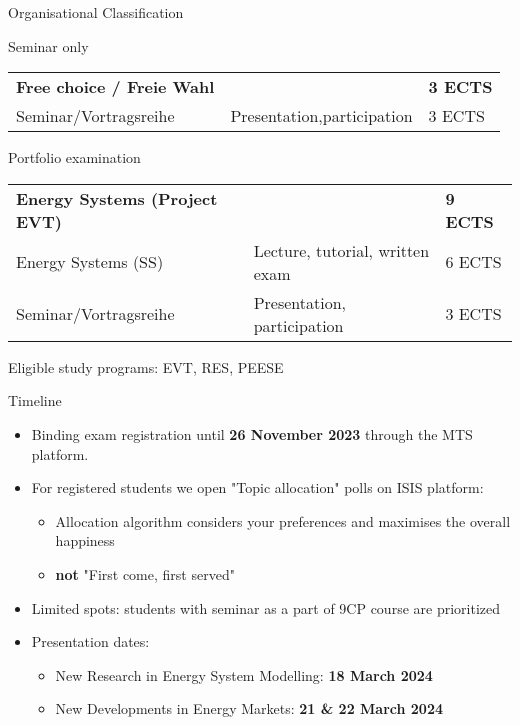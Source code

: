 \documentclass[10pt,aspectratio=169,dvipsnames]{beamer}
\begin{document}
\begin{frame}{Organisational Classification}

    \begin{block}{Seminar only}
          \begin{tabularx}{0.8\textwidth}{l l l}
            \textbf{Free choice / Freie Wahl} & & \textbf{3 ECTS}\\
            Seminar/Vortragsreihe & Presentation,participation & 3 ECTS
          \end{tabularx}
    \end{block}
    \begin{block}{Portfolio examination}
    \begin{tabularx}{0.8\textwidth}{l l l}
            \textbf{Energy Systems (Project EVT)} & & \textbf{9 ECTS}\\
            Energy Systems (SS)   & Lecture, tutorial, written exam & 6 ECTS \\
            Seminar/Vortragsreihe & Presentation, participation     & 3 ECTS
      \end{tabularx}
      \newline
      \newline
      Eligible study programs: EVT, RES, PEESE
  \end{block}
          


\end{frame}


\begin{frame}{Timeline}

  \begin{itemize}
    \item Binding exam registration until \textbf{26 November 2023} through the MTS platform.
    \item For registered students we open "Topic allocation" polls on ISIS platform: 
        \begin{itemize}
            \item Allocation algorithm considers your preferences and maximises the overall happiness
            \item \textbf{not} "First come, first served"
          \end{itemize}
    \item Limited spots: students with seminar as a part of 9CP course are prioritized
    \item Presentation dates:
          \begin{itemize}
            \item New Research in Energy System Modelling: \textbf{18 March 2024}
            \item New Developments in Energy Markets: \textbf{21 \& 22  March 2024}
          \end{itemize}
  \end{itemize}

\end{frame}
\end{document}
